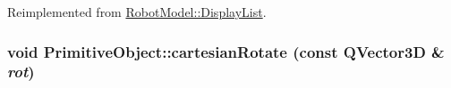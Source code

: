 Reimplemented from \hyperlink{class_robot_model_1_1_display_list_a023ba88eaac38b26dc9ea6a358467637}{RobotModel::DisplayList}.\hypertarget{class_robot_model_1_1_primitive_object_a69c30287deb6549fbde68d1ba37424a8}{
\subsubsection[{cartesianRotate}]{\setlength{\rightskip}{0pt plus 5cm}void PrimitiveObject::cartesianRotate (const QVector3D \& {\em rot})}}
\label{class_robot_model_1_1_primitive_object_a69c30287deb6549fbde68d1ba37424a8}



